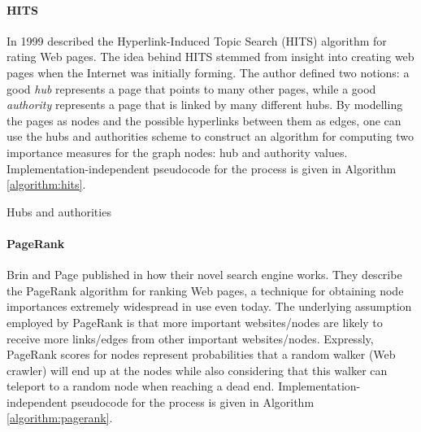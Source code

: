 \paragraph{HITS} In 1999 \cite{kleinberg_authoritative_1999} described the Hyperlink-Induced Topic Search (HITS) algorithm for rating Web pages. The idea behind HITS stemmed from insight into creating web pages when the Internet was initially forming. The author defined two notions: a good \emph{hub} represents a page that points to many other pages, while a good \emph{authority} represents a page that is linked by many different hubs. By modelling the pages as nodes and the possible hyperlinks between them as edges, one can use the hubs and authorities scheme to construct an algorithm for computing two importance measures for the graph nodes: hub and authority values. Implementation-independent pseudocode for the process is given in Algorithm \ref{algorithm:hits}.

\begin{algorithm}[H]
\caption{Hubs and authorities}
\label{algorithm:hits}
\begin{algorithmic}
\ENDWHILE
{}
\end{algorithmic}
\end{algorithm}

\paragraph{PageRank} Brin and Page published in \cite{brin_anatomy_1998} how their novel search engine works. They describe the PageRank algorithm for ranking Web pages, a technique for obtaining node importances extremely widespread in use even today. The underlying assumption employed by PageRank is that more important websites/nodes are likely to receive more links/edges from other important websites/nodes. Expressly, PageRank scores for nodes represent probabilities that a random walker (Web crawler) will end up at the nodes while also considering that this walker can teleport to a random node when reaching a dead end. Implementation-independent pseudocode for the process is given in Algorithm \ref{algorithm:pagerank}.

